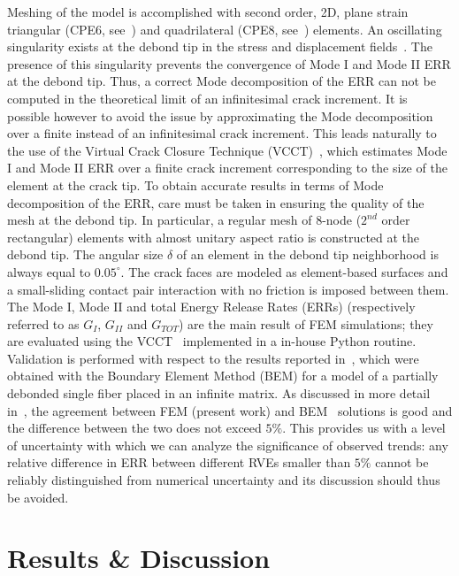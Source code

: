 \documentclass[smallextended]{svjour3}       %
\begin{document}
Meshing of the model is accomplished with second order, 2D, plane strain triangular (CPE6, see~\cite{abq12}) and quadrilateral (CPE8, see~\cite{abq12}) elements. An oscillating singularity exists at the debond tip in the stress and displacement fields~\cite{England1971,Toya1974,Comninou1977}. The presence of this singularity prevents the convergence of Mode I and Mode II ERR at the debond tip. Thus, a correct Mode decomposition of the ERR can not be computed in the theoretical limit of an infinitesimal crack increment. It is possible however to avoid the issue by approximating the Mode decomposition over a finite instead of an infinitesimal crack increment. This leads naturally to the use of the Virtual Crack Closure Technique (VCCT)~\cite{Krueger2004}, which estimates Mode I and Mode II ERR over a finite crack increment corresponding to the size of the element at the crack tip. To obtain accurate results in terms of Mode decomposition of the ERR, care must be taken in ensuring the quality of the mesh at the debond tip. In particular, a regular mesh of 8-node ($2^{nd}$ order rectangular) elements with almost unitary aspect ratio is constructed at the debond tip. The angular size $\delta$ of an element in the debond tip neighborhood is always equal to $0.05^{\circ}$. The crack faces are modeled as element-based surfaces and a small-sliding contact pair interaction with no friction is imposed between them. The Mode I, Mode II and total Energy Release Rates (ERRs) (respectively referred to as $G_{I}$, $G_{II}$ and $G_{TOT}$) are the main result of FEM simulations; they are evaluated using the VCCT~\cite{Krueger2004} implemented in a in-house Python routine. Validation is performed with respect to the results reported in~\cite{Paris2007,Sandino2016}, which were obtained with the Boundary Element Method (BEM) for a model of a partially debonded single fiber placed in an infinite matrix. As discussed in more detail in~\cite{DiStasio2019}, the agreement between FEM (present work) and BEM~\cite{Paris2007,Sandino2016} solutions is good and the difference between the two does not exceed $5\%$. This provides us with a level of uncertainty with which we can analyze the significance of observed trends: any relative difference in ERR between different RVEs smaller than $5\%$ cannot be reliably distinguished from numerical uncertainty and its discussion should thus be avoided.

\section{Results \& Discussion}\label{sec:results}
\end{document}
